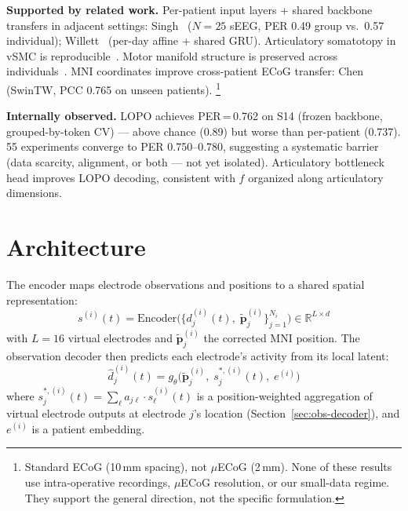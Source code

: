 \documentclass[11pt,letterpaper]{article}
\newcommand{\bfp}{\mathbf{p}}
\newcommand{\R}{\mathbb{R}}
\begin{document}
\textbf{Supported by related work.}
Per-patient input layers + shared backbone transfers in adjacent settings: Singh~\cite{singh2025} ($N{=}25$ sEEG, PER 0.49 group vs.\ 0.57 individual); Willett~\cite{willett2023} (per-day affine + shared GRU).
Articulatory somatotopy in vSMC is reproducible~\cite{metzger2023,bouchard2013}.
Motor manifold structure is preserved across individuals~\cite{safaie2023,gallego2020}.
MNI coordinates improve cross-patient ECoG transfer: Chen~\cite{chen2025} (SwinTW, PCC 0.765 on unseen patients).%
\footnote{Standard ECoG (10\,mm spacing), not $\mu$ECoG (2\,mm). None of these results use intra-operative recordings, $\mu$ECoG resolution, or our small-data regime. They support the general direction, not the specific formulation.}

\textbf{Internally observed.}
LOPO achieves PER\,=\,0.762 on S14 (frozen backbone, grouped-by-token CV) --- above chance (0.89) but worse than per-patient (0.737).
55 experiments converge to PER 0.750--0.780, suggesting a systematic barrier (data scarcity, alignment, or both --- not yet isolated).
Articulatory bottleneck head improves LOPO decoding, consistent with $f$ organized along articulatory dimensions.



\section{Architecture}\label{sec:architecture}

The encoder maps electrode observations and positions to a shared spatial representation:
\begin{equation}\label{eq:encoder}
s^{(i)}(t) = \text{Encoder}\bigl(\{d_j^{(i)}(t),\; \tilde{\bfp}_j^{(i)}\}_{j=1}^{N_i}\bigr) \in \R^{L \times d}
\end{equation}
with $L{=}16$ virtual electrodes and $\tilde{\bfp}_j^{(i)}$ the corrected MNI position. The observation decoder then predicts each electrode's activity from its local latent:
\begin{equation}\label{eq:implemented}
\boxed{\hat{d}_j^{(i)}(t) = g_\theta\bigl(\tilde{\bfp}_j^{(i)},\; s_j^{*,(i)}(t),\; e^{(i)}\bigr)}
\end{equation}
where $s_j^{*,(i)}(t) = \sum_\ell a_{j\ell} \cdot s_\ell^{(i)}(t)$ is a position-weighted aggregation of virtual electrode outputs at electrode $j$'s location (Section~\ref{sec:obs-decoder}), and $e^{(i)}$ is a patient embedding.
\end{document}
